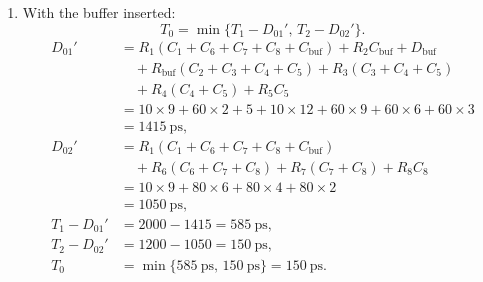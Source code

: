 \documentclass[11pt]{article}
\begin{document}
\begin{enumerate}[label=(\alph*)]
  \item With the buffer inserted:
  \[
    T_0 = \min\{T_1 - D_{01}',\, T_2 - D_{02}'\}.
  \]
  \begin{align*}
    D_{01}' &= R_1(C_1 + C_6 + C_7 + C_8 + C_{\text{buf}}) + R_2 C_{\text{buf}} + D_{\text{buf}} \\
            &\quad {}+ R_{\text{buf}}(C_2 + C_3 + C_4 + C_5) + R_3(C_3 + C_4 + C_5) \\
            &\quad {}+ R_4(C_4 + C_5) + R_5 C_5 \\
            &= 10\times 9 + 60\times 2 + 5 + 10\times 12 + 60\times 9 + 60\times 6 + 60\times 3 \\
            &= 1415~\text{ps}, \\
    D_{02}' &= R_1(C_1 + C_6 + C_7 + C_8 + C_{\text{buf}}) \\
            &\quad {}+ R_6(C_6 + C_7 + C_8) + R_7(C_7 + C_8) + R_8 C_8 \\
            &= 10\times 9 + 80\times 6 + 80\times 4 + 80\times 2 \\
            &= 1050~\text{ps}, \\
    T_1 - D_{01}' &= 2000 - 1415 = 585~\text{ps}, \\
    T_2 - D_{02}' &= 1200 - 1050 = 150~\text{ps}, \\
    T_0 &= \min\{585~\text{ps},\, 150~\text{ps}\} = 150~\text{ps}.
  \end{align*}
\end{enumerate}
\end{document}
